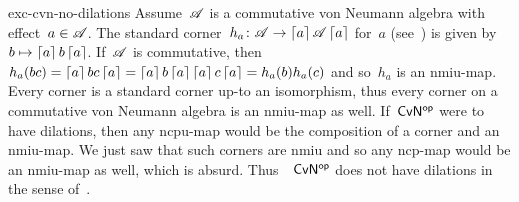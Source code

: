 \begin{solution}{exc-cvn-no-dilations}%
Assume~$\mathscr{A}$ is a commutative von Neumann algebra
    with effect~$a \in \mathscr{A}$.
The standard corner~$h_a\colon \mathscr{A} \to \left\lceil a\right\rceil \mathscr{A} \left\lceil a\right\rceil$
    for~$a$ (see~)
    is given by~$b \mapsto \left\lceil a\right\rceil b \left\lceil a\right\rceil$.
If~$\mathscr{A}$ is commutative,
    then~$h_a(bc) = \left\lceil a\right\rceil bc \left\lceil a\right\rceil
            = \left\lceil a\right\rceil b \left\lceil a\right\rceil \left\lceil a\right\rceil c \left\lceil a\right\rceil = h_a(b) h_a(c)$
            and so~$h_a$ is an nmiu-map.
Every corner is a standard corner up-to an isomorphism,
    thus every corner on a commutative von Neumann algebra
    is an nmiu-map as well.
If~${\mathsf{CvN}}{^{\mathsf{op}}}$ were to have dilations,
    then any ncpu-map would be the composition of a corner and an nmiu-map.
We just saw that such corners are nmiu and so any ncp-map would be an nmiu-map
    as well, which is absurd.  Thus~~${\mathsf{CvN}}{^{\mathsf{op}}}$ does not have dilations
        in the sense of~.
\end{solution}

